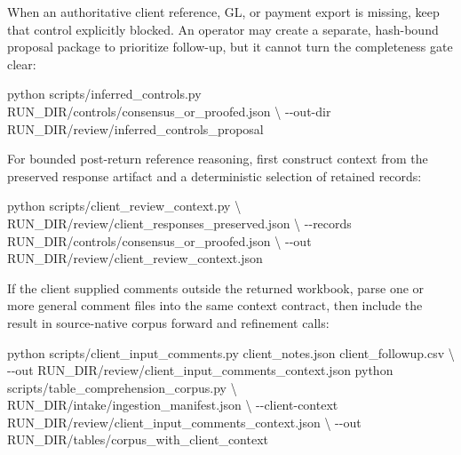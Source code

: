 \documentclass[
]{article}
\newenvironment{Shaded}{}{}
\newcommand{\AttributeTok}[1]{\textcolor[rgb]{0.49,0.56,0.16}{#1}}
\newcommand{\DataTypeTok}[1]{\textcolor[rgb]{0.56,0.13,0.00}{#1}}
\newcommand{\ExtensionTok}[1]{#1}
\newcommand{\NormalTok}[1]{#1}
\begin{document}
When an authoritative client reference, GL, or payment export is
missing, keep that control explicitly blocked. An operator may create a
separate, hash-bound proposal package to prioritize follow-up, but it
cannot turn the completeness gate clear:

\begin{Shaded}
\begin{Highlighting}[]
\ExtensionTok{python}\NormalTok{ scripts/inferred\_controls.py RUN\_DIR/controls/consensus\_or\_proofed.json }\DataTypeTok{\textbackslash{}}
  \AttributeTok{{-}{-}out{-}dir}\NormalTok{ RUN\_DIR/review/inferred\_controls\_proposal}
\end{Highlighting}
\end{Shaded}

For bounded post-return reference reasoning, first construct context
from the preserved response artifact and a deterministic selection of
retained records:

\begin{Shaded}
\begin{Highlighting}[]
\ExtensionTok{python}\NormalTok{ scripts/client\_review\_context.py }\DataTypeTok{\textbackslash{}}
\NormalTok{  RUN\_DIR/review/client\_responses\_preserved.json }\DataTypeTok{\textbackslash{}}
  \AttributeTok{{-}{-}records}\NormalTok{ RUN\_DIR/controls/consensus\_or\_proofed.json }\DataTypeTok{\textbackslash{}}
  \AttributeTok{{-}{-}out}\NormalTok{ RUN\_DIR/review/client\_review\_context.json}
\end{Highlighting}
\end{Shaded}

If the client supplied comments outside the returned workbook, parse one
or more general comment files into the same context contract, then
include the result in source-native corpus forward and refinement calls:

\begin{Shaded}
\begin{Highlighting}[]
\ExtensionTok{python}\NormalTok{ scripts/client\_input\_comments.py client\_notes.json client\_followup.csv }\DataTypeTok{\textbackslash{}}
  \AttributeTok{{-}{-}out}\NormalTok{ RUN\_DIR/review/client\_input\_comments\_context.json}
\ExtensionTok{python}\NormalTok{ scripts/table\_comprehension\_corpus.py }\DataTypeTok{\textbackslash{}}
\NormalTok{  RUN\_DIR/intake/ingestion\_manifest.json }\DataTypeTok{\textbackslash{}}
  \AttributeTok{{-}{-}client{-}context}\NormalTok{ RUN\_DIR/review/client\_input\_comments\_context.json }\DataTypeTok{\textbackslash{}}
  \AttributeTok{{-}{-}out}\NormalTok{ RUN\_DIR/tables/corpus\_with\_client\_context}
\end{Highlighting}
\end{Shaded}
\end{document}
